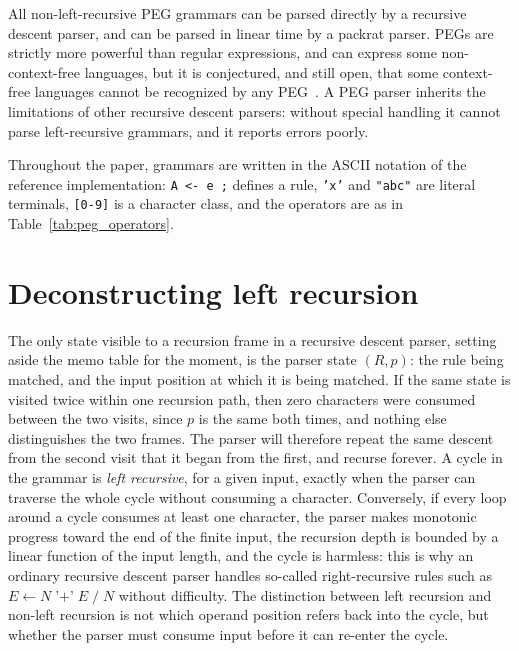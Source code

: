 \documentclass[manuscript]{acmart}
\newcommand{\cd}[1]{\texttt{#1}}
\begin{document}
All non-left-recursive PEG grammars can be parsed directly by a recursive descent parser, and can be parsed in linear time by a packrat parser. PEGs are strictly more powerful than regular expressions, and can express some non-context-free languages, but it is conjectured, and still open, that some context-free languages cannot be recognized by any PEG~\cite{ford2004}. A PEG parser inherits the limitations of other recursive descent parsers: without special handling it cannot parse left-recursive grammars, and it reports errors poorly.

Throughout the paper, grammars are written in the ASCII notation of the reference implementation: \cd{A <- e ;} defines a rule, \cd{'x'} and \cd{"abc"} are literal terminals, \cd{[0-9]} is a character class, and the operators are as in Table~\ref{tab:peg_operators}.

\section{Deconstructing left recursion}
\label{sec:deconstruct}

The only state visible to a recursion frame in a recursive descent parser, setting aside the memo table for the moment, is the parser state $(R, p)$: the rule being matched, and the input position at which it is being matched. If the same state is visited twice within one recursion path, then zero characters were consumed between the two visits, since $p$ is the same both times, and nothing else distinguishes the two frames. The parser will therefore repeat the same descent from the second visit that it began from the first, and recurse forever. A cycle in the grammar is \emph{left recursive}, for a given input, exactly when the parser can traverse the whole cycle without consuming a character. Conversely, if every loop around a cycle consumes at least one character, the parser makes monotonic progress toward the end of the finite input, the recursion depth is bounded by a linear function of the input length, and the cycle is harmless: this is why an ordinary recursive descent parser handles so-called right-recursive rules such as $E \leftarrow N \; \texttt{'+'} \; E \; / \; N$ without difficulty. The distinction between left recursion and non-left recursion is not which operand position refers back into the cycle, but whether the parser must consume input before it can re-enter the cycle.
\end{document}
